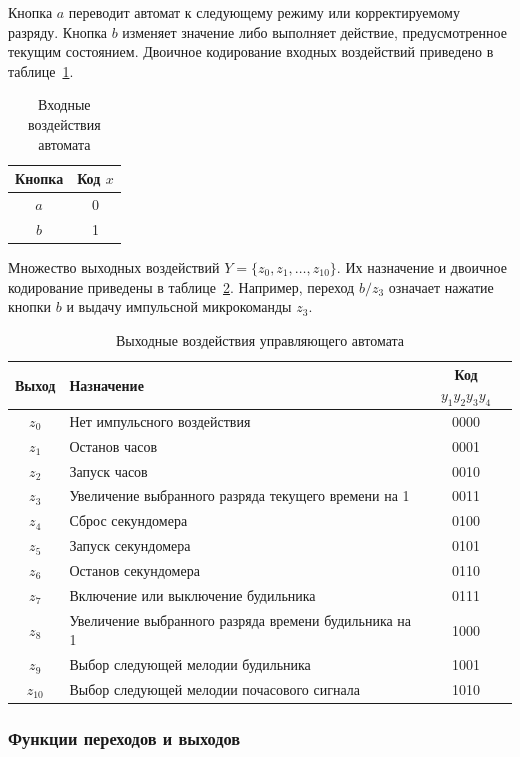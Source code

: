 Кнопка $a$ переводит автомат к следующему режиму или корректируемому
разряду. Кнопка $b$ изменяет значение либо выполняет действие,
предусмотренное текущим состоянием. Двоичное кодирование входных
воздействий приведено в таблице~\ref{tab:inputs}.

\begin{table}[ht]
\centering
\caption{Входные воздействия автомата}
\label{tab:inputs}
\small
\begin{tabular}{|c|c|}
\hline
Кнопка & Код $x$ \\
\hline
$a$ & 0 \\
$b$ & 1 \\
\hline
\end{tabular}
\end{table}

Множество выходных воздействий $Y=\{z_0,z_1,\ldots,z_{10}\}$. Их назначение
и двоичное кодирование приведены в таблице~\ref{tab:outputs}. Например,
переход $b/z_3$ означает нажатие кнопки $b$ и выдачу импульсной микрокоманды
$z_3$.

\begin{table}[ht]
\centering
\caption{Выходные воздействия управляющего автомата}
\label{tab:outputs}
\small
\begin{tabular}{|c|p{8cm}|c|}
\hline
Выход & Назначение & Код $y_1y_2y_3y_4$ \\
\hline
$z_0$ & Нет импульсного воздействия & 0000 \\
$z_1$ & Останов часов & 0001 \\
$z_2$ & Запуск часов & 0010 \\
$z_3$ & Увеличение выбранного разряда текущего времени на 1 & 0011 \\
$z_4$ & Сброс секундомера & 0100 \\
$z_5$ & Запуск секундомера & 0101 \\
$z_6$ & Останов секундомера & 0110 \\
$z_7$ & Включение или выключение будильника & 0111 \\
$z_8$ & Увеличение выбранного разряда времени будильника на 1 & 1000 \\
$z_9$ & Выбор следующей мелодии будильника & 1001 \\
$z_{10}$ & Выбор следующей мелодии почасового сигнала & 1010 \\
\hline
\end{tabular}
\end{table}

\subsubsection{Функции переходов и выходов}

